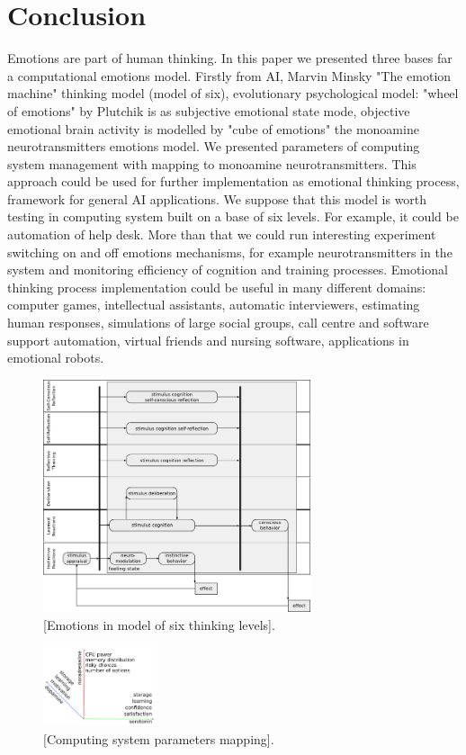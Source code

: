 \section{Conclusion}

Emotions are part of human thinking. In this paper we presented three bases far a computational emotions model. Firstly from AI, Marvin Minsky "The emotion machine"\cite{emotionmachine} thinking model (model of six), evolutionary psychological model: "wheel of emotions" by Plutchik\cite{natureofemotions} is as subjective emotional state mode, objective emotional brain activity is modelled by "cube of emotions" the monoamine neurotransmitters emotions model. We presented parameters of computing system management with mapping to monoamine neurotransmitters. This approach could be used for further implementation as emotional thinking process, framework for general AI applications. We suppose that this model is worth testing in computing system built on a base of six levels. For example, it could be automation of help desk. More than that we could run interesting experiment switching on and off emotions mechanisms, for example neurotransmitters in the system and monitoring efficiency of cognition and training processes. Emotional thinking process implementation could be useful in many different domains: computer games, intellectual assistants, automatic interviewers, estimating human responses, simulations of large social groups, call centre and software support automation, virtual friends and nursing software, applications in emotional robots.

\begin{figure}[h!]
 \centering
 \includegraphics[width=0.7\textwidth]{six_levels_of_emotions}
 \caption{[Emotions in model of six thinking levels].}
\end{figure}

\begin{figure}[h!]
 \centering
 \includegraphics[width=0.3\textwidth]{parameters_mapping180}
 \caption{[Computing system parameters mapping].}
\end{figure}
